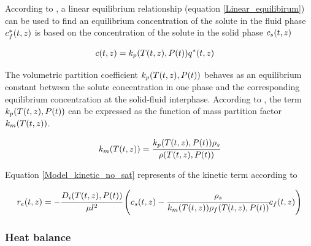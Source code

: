 \documentclass[../Article_Model_Parameters.tex]{subfiles}
\begin{document}
		According to \citet{Bulley1984}, a linear equilibrium relationship (equation  \ref{Linear_equilibirum}) can be used to find an equilibrium concentration of the solute in the fluid phase ${\color{black}c_f^*}(t,z)$ is based on the concentration of the solute in the solid phase ${\color{black}c_s}(t,z)$ 
			
			{\footnotesize
				\begin{align} \label{Linear_equilibirum}
					{\color{black}c}(t,z) &= {\color{black}k_p}({\color{black}T}(t,z),{\color{black}P}(t)) \allowbreak {\color{black}q^*}(t,z)
			\end{align} }
			
			The volumetric partition coefficient ${\color{black}k_p}({\color{black}T}(t,z),{\color{black}P}(t))$ behaves as an equilibrium constant between the solute concentration in one phase and the corresponding equilibrium concentration at the solid-fluid interphase. According to \citet{Spiro2007}, the term ${\color{black}k_p}({\color{black}T}(t,z),{\color{black}P}(t))$ can be expressed as the function of mass partition factor ${\color{black}k_m}({\color{black}T}(t,z))$.
			
			{\footnotesize
				\begin{align}
					{\color{black}k_m}({\color{black}T}(t,z)) = \cfrac{{\color{black}k_p}({\color{black}T}(t,z),{\color{black}P}(t)) {\color{black}\rho_s}}{{\color{black}\rho}({\color{black}T}(t,z),{\color{black}P}(t))}
			\end{align} }
			
			Equation \ref{Model_kinetic_no_sat} represents of the kinetic term according to \citet{Reverchon1996}
			
			{\footnotesize
				\begin{equation}
					\label{Model_kinetic_no_sat}
					{\color{black}r_e}(t,z) = -\cfrac{{\color{black}D_i}({\color{black}T}(t,z), {\color{black}P}(t))}{{\color{black} \mu l^2} }\left({\color{black}c_s}(t,z) - \cfrac{{\color{black}\rho_s}}{{\color{black}k_m}({\color{black}T}(t,z)){\color{black}\rho_f}({\color{black}T}(t,z),{\color{black}P}(t))}  {\color{black}c_f}(t,z) \right)
			\end{equation} }

        
			
		\subsubsection{Heat balance} \label{CH: heat_balance}
		
\end{document}
